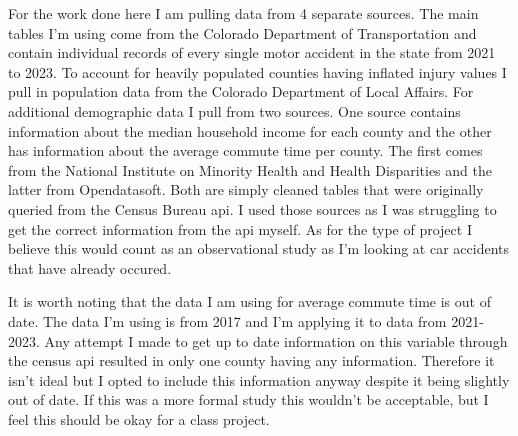 For the work done here I am pulling data from 4 separate sources. The main tables I'm using come from the Colorado Department of Transportation and contain individual records of every single motor accident in the state from 2021 to 2023. To account for heavily populated counties having inflated injury values I pull in population data from the Colorado Department of Local Affairs. For additional demographic data I pull from two sources. One source contains information about the median household income for each county and the other has information about the average commute time per county. The first comes from the National Institute on Minority Health and Health Disparities and the latter from Opendatasoft. Both are simply cleaned tables that were originally queried from the Census Bureau api. I used those sources as I was struggling to get the correct information from the api myself. As for the type of project I believe this would count as an observational study as I'm looking at car accidents that have already occured. 

It is worth noting that the data I am using for average commute time is out of date. The data I'm using is from 2017 and I'm applying it to data from 2021-2023. Any attempt I made to get up to date information on this variable through the census api resulted in only one county having any information. Therefore it isn't ideal but I opted to include this information anyway despite it being slightly out of date. If this was a more formal study this wouldn't be acceptable, but I feel this should be okay for a class project. 